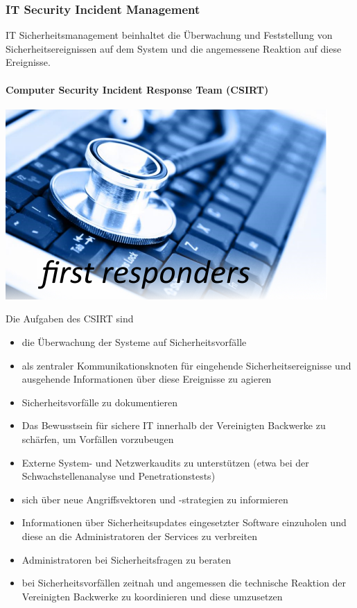 \documentclass[]{article}
\let\oldparagraph\paragraph
\renewcommand{\paragraph}[1]{\oldparagraph{#1}\mbox{}}
\begin{document}
\subsubsection{IT Security Incident
Management}\label{it-security-incident-management}

IT Sicherheitsmanagement beinhaltet die Überwachung und Feststellung von
Sicherheitsereignissen auf dem System und die angemessene Reaktion auf
diese Ereignisse.

\paragraph{Computer Security Incident Response Team
(CSIRT)}\label{computer-security-incident-response-team-csirt}

\includegraphics[width=4.83401in,height=2.85457in]{images/image3.png}

Die Aufgaben des CSIRT sind

\begin{itemize}
\item
  die Überwachung der Systeme auf Sicherheitsvorfälle
\item
  als zentraler Kommunikationsknoten für eingehende
  Sicherheitsereignisse und ausgehende Informationen über diese
  Ereignisse zu agieren
\item
  Sicherheitsvorfälle zu dokumentieren
\item
  Das Bewusstsein für sichere IT innerhalb der Vereinigten Backwerke zu
  schärfen, um Vorfällen vorzubeugen
\item
  Externe System- und Netzwerkaudits zu unterstützen (etwa bei der
  Schwachstellenanalyse und Penetrationstests)
\item
  sich über neue Angriffsvektoren und -strategien zu informieren
\item
  Informationen über Sicherheitsupdates eingesetzter Software einzuholen
  und diese an die Administratoren der Services zu verbreiten
\item
  Administratoren bei Sicherheitsfragen zu beraten
\item
  bei Sicherheitsvorfällen zeitnah und angemessen die technische
  Reaktion der Vereinigten Backwerke zu koordinieren und diese
  umzusetzen
\end{itemize}
\end{document}
